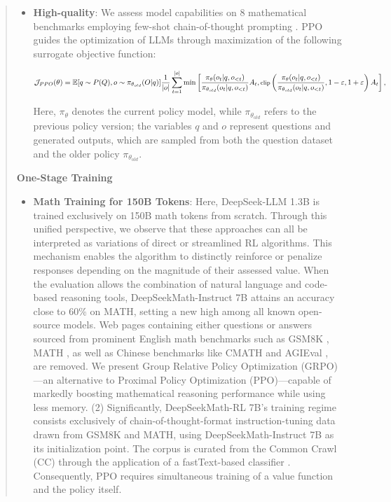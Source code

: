 \begin{abstract}
\begin{itemize}[topsep=0pt]
\begin{itemize}[topsep=0pt]
\begin{itemize}[topsep=0pt]
    \item \textbf{High-quality}:
    We assess model capabilities on 8 mathematical benchmarks employing few-shot chain-of-thought prompting \cite{cot}. PPO guides the optimization of LLMs through maximization of the following surrogate objective function:

\begin{equation}
\footnotesize
    \mathcal{J}_{PPO}(\theta) = \mathbb{E}{[q \sim P(Q), o \sim \pi_{\theta_{old}}(O|q)]} \frac{1}{|o|} \sum_{t=1}^{|o|} \min \left[ \frac{\pi_\theta(o_{t} | q, o_{<t})}{\pi_{\theta_{old}}(o_{t} | q, o_{<t})} A_{t}, \text{clip} \left( \frac{\pi_\theta(o_{t} | q, o_{<t})}{\pi_{\theta_{old}}(o_{t} | q, o_{<t})}, 1 - \varepsilon, 1 + \varepsilon \right)  A_{t} \right] ,
\end{equation}

Here, $\pi_{\theta}$ denotes the current policy model, while $\pi_{\theta_{old}}$ refers to the previous policy version; the variables $q$ and $o$ represent questions and generated outputs, which are sampled from both the question dataset and the older policy $\pi_{\theta_{old}}$. \end{itemize}

\textbf{One-Stage Training}

\begin{itemize}[topsep=0pt]
    \item \textbf{Math Training for 150B Tokens}: Here, DeepSeek-LLM 1.3B is trained exclusively on 150B math tokens from scratch. Through this unified perspective, we observe that these approaches can all be interpreted as variations of direct or streamlined RL algorithms. This mechanism enables the algorithm to distinctly reinforce or penalize responses depending on the magnitude of their assessed value. When the evaluation allows the combination of natural language and code-based reasoning tools, DeepSeekMath-Instruct 7B attains an accuracy close to 60\% on MATH, setting a new high among all known open-source models. Web pages containing either questions or answers sourced from prominent English math benchmarks such as GSM8K \citep{gsm8k}, MATH \citep{MATH}, as well as Chinese benchmarks like CMATH \citep{wei2023cmath} and AGIEval \citep{agieval}, are removed. We present Group Relative Policy Optimization (GRPO)—an alternative to Proximal Policy Optimization (PPO)—capable of markedly boosting mathematical reasoning performance while using less memory. (2) Significantly, DeepSeekMath-RL 7B's training regime consists exclusively of chain-of-thought-format instruction-tuning data drawn from GSM8K and MATH, using DeepSeekMath-Instruct 7B as its initialization point. The corpus is curated from the Common Crawl (CC) through the application of a fastText-based classifier \citep{joulin2016fasttext}. Consequently, PPO requires simultaneous training of a value function and the policy itself. \end{itemize}


\end{itemize}
\end{itemize}
\end{abstract}
